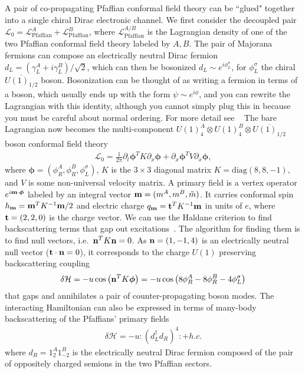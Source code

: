 A pair of co-propagating Pfaffian conformal field theory can be ``glued" together into a single chiral Dirac electronic channel. We first consider the decoupled pair $\mathcal{L}_0=\mathcal{L}_{\mathrm{Pfaffian}}^A+\mathcal{L}_{\mathrm{Pfaffian}}^B$, where $\mathcal{L}_{\mathrm{Pfaffian}}^{A/B}$ is the Lagrangian density of one of the two Pfaffian conformal field theory labeled by $A,B$. The pair of Majorana fermions can compose an electrically neutral Dirac fermion $d_L=(\gamma^A_L+i\gamma^B_L)/\sqrt{2}$, which can then be bosonized $d_L\sim e^{i\phi^\sigma_L}$, for $\phi^\sigma_L$ the chiral $\overline{U(1)_{1/2}}$ boson. Bosonization can be thought of as writing a fermion in terms of a boson, which usually ends up with the form $\psi\sim e^{i\phi}$, and you can rewrite the Lagrangian with this identity, although you cannot simply plug this in because you must be careful about normal ordering. For more detail see ~\cite{senechal99} The bare Lagrangian now becomes the multi-component $U(1)_4^A\otimes U(1)_4^B\otimes\overline{U(1)_{1/2}}$ boson conformal field theory \begin{align}\mathcal{L}_0=\frac{1}{2\pi}\partial_t\boldsymbol{\phi}^TK\partial_x\boldsymbol{\phi}+\partial_x\boldsymbol{\phi}^TV\partial_x\boldsymbol{\phi},\label{881}\end{align} where $\boldsymbol{\phi}=(\phi_R^A,\phi_R^B,\phi^\sigma_L)$, $K$ is the $3\times3$ diagonal matrix $K=\mathrm{diag}(8,8,-1)$, and $V$ is some non-universal velocity matrix. A primary field is a vertex operator $e^{i{\bf m}\cdot\boldsymbol{\phi}}$ labeled by an integral vector ${\bf m}=(m^A,m^B,\tilde{m})$. It carries conformal spin $h_{\bf m}={\bf m}^TK^{-1}{\bf m}/2$ and electric charge $q_{\bf m}={\bf t}^TK^{-1}{\bf m}$ in units of $e$, where ${\bf t}=(2,2,0)$ is the charge vector. We can use the Haldane criterion to find backscattering terms that gap out excitations~\cite{Haldane95}. The algorithm for finding them is to find null vectors, i.e.~${\bf n}^TK{\bf n}=0$.  As ${\bf n}=(1,-1,4)$ is an electrically neutral null vector (${\bf t}\cdot{\bf n}=0$), it corresponds to the charge $U(1)$ preserving backscattering coupling \begin{align}\delta\mathcal{H}=-u\cos\left({\bf n}^TK\boldsymbol{\phi}\right)=-u\cos\left(8\phi^A_R-8\phi^B_R-4\phi^\sigma_L\right)\label{glueingH}\end{align} that gaps and annihilates a pair of counter-propagating boson modes. The interacting Hamiltonian can also be expressed in terms of many-body backscattering of the Pfaffians' primary fields \begin{align}\delta\mathcal{H}=-u:\left(d_L^\dagger d_R\right)^4:+h.c.\end{align} where $d_R=1_2^A1_{-2}^B$ is the electrically neutral Dirac fermion composed of the pair of oppositely charged semions in the two Pfaffian sectors.

